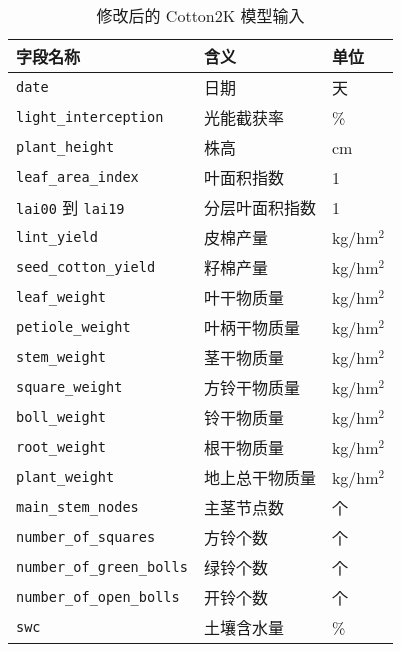 \begin{table}
    \caption{修改后的 Cotton2K 模型输入}\label{tab:output}
    \centering
    \begin{tabular}{lll}
        \toprule
        字段名称                          & 含义           & 单位      \\
        \midrule
        \texttt{date}                     & 日期           & 天        \\
        \texttt{light\_interception}      & 光能截获率     & \%        \\
        \texttt{plant\_height}            & 株高           & cm        \\
        \texttt{leaf\_area\_index}        & 叶面积指数     & 1         \\
        \texttt{lai00} 到 \texttt{lai19}  & 分层叶面积指数 & 1         \\
        \texttt{lint\_yield}              & 皮棉产量       & kg/hm$^2$ \\
        \texttt{seed\_cotton\_yield}      & 籽棉产量       & kg/hm$^2$ \\
        \texttt{leaf\_weight}             & 叶干物质量     & kg/hm$^2$ \\
        \texttt{petiole\_weight}          & 叶柄干物质量   & kg/hm$^2$ \\
        \texttt{stem\_weight}             & 茎干物质量     & kg/hm$^2$ \\
        \texttt{square\_weight}           & 方铃干物质量   & kg/hm$^2$ \\
        \texttt{boll\_weight}             & 铃干物质量     & kg/hm$^2$ \\
        \texttt{root\_weight}             & 根干物质量     & kg/hm$^2$ \\
        \texttt{plant\_weight}            & 地上总干物质量 & kg/hm$^2$ \\
        \texttt{main\_stem\_nodes}        & 主茎节点数     & 个        \\
        \texttt{number\_of\_squares}      & 方铃个数       & 个        \\
        \texttt{number\_of\_green\_bolls} & 绿铃个数       & 个        \\
        \texttt{number\_of\_open\_bolls}  & 开铃个数       & 个        \\
        \texttt{swc}                      & 土壤含水量     & \%        \\
        \bottomrule
    \end{tabular}
\end{table}

